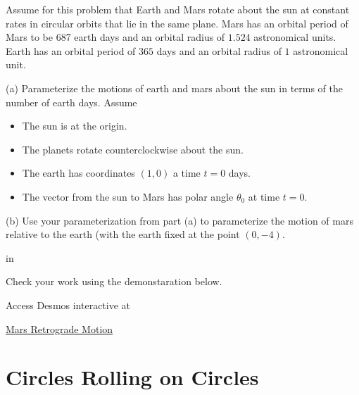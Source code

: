 \documentclass{ximera}
\newcommand{\pskip}{\vskip 0.1 in}
\begin{document}
\begin{exploration}  \label{Ed6t6yhh}
Assume for this problem that Earth and Mars rotate about the sun at constant rates in circular orbits that lie in the same plane. Mars has an orbital period of Mars to be 687 earth days and an orbital radius of $1.524$ astronomical units. Earth has an orbital period of $365$ days and an orbital radius of $1$ astronomical unit.

(a) Parameterize the motions of earth and mars about the sun in terms of the number of earth days. Assume

\begin{itemize}

\item{The sun is at the origin.}

\item{The planets rotate counterclockwise about the sun.}

\item{The earth has coordinates $(1,0)$ a time $t=0$ days.}

\item{The vector from the sun to Mars has polar angle $\theta_0$ at time $t=0$.}

\end{itemize}

(b) Use your parameterization from part (a)  to parameterize the motion of mars relative to the earth (with the earth  fixed at the point $(0,-4)$.

\pskip

Check your work using the demonstaration below.

Access Desmos interactive at
 
\href{https://www.desmos.com/calculator/htc4xgrjxs}{Mars Retrograde Motion}

 
\begin{onlineOnly}
    \begin{center}
\end{center}
\end{onlineOnly}


\end{exploration}


\section{Circles Rolling on Circles}
\end{document}
